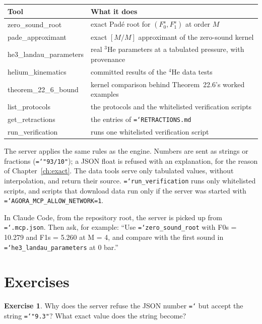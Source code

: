 \documentclass[11pt,a4paper,openany]{book}
\newcommand{\Fzs}{F_0^{s}}
\newcommand{\Fos}{F_1^{s}}
\newcommand{\code}[1]{\texttt{\hyphenchar\font=`\-\relax #1}}
\theoremstyle{definition}
\newtheorem{exercise}{Exercise}[chapter]
\theoremstyle{plain}
\begin{document}
\begin{center}
\small
\begin{tabular}{>{\ttfamily}l>{\raggedright\arraybackslash}p{9.6cm}}
\toprule
\textrm{Tool} & What it does \\
\midrule
zero\_sound\_root & exact Padé root for $(\Fzs,\Fos)$ at order $M$ \\
pade\_approximant & exact $[M/M]$ approximant of the zero-sound kernel \\
he3\_landau\_parameters & real $^3$He parameters at a tabulated pressure, with provenance \\
helium\_kinematics & committed results of the $^4$He data tests \\
theorem\_22\_6\_bound & kernel comparison behind Theorem~22.6's worked examples \\
list\_protocols & the protocols and the whitelisted verification scripts \\
get\_retractions & the entries of \code{RETRACTIONS.md} \\
run\_verification & runs one whitelisted verification script \\
\bottomrule
\end{tabular}
\end{center}

The server applies the same rules as the engine. Numbers are sent as strings or fractions
(\code{"93/10"}); a JSON float is refused with an explanation, for the reason of
Chapter~\ref{ch:exact}. The data tools serve only tabulated values, without interpolation, and
return their source. \code{run\_verification} runs only whitelisted scripts, and scripts that
download data run only if the server was started with \code{AGORA\_MCP\_ALLOW\_NETWORK=1}.

\begin{runit}
In Claude Code, from the repository root, the server is picked up from \code{.mcp.json}. Then
ask, for example: ``Use \code{zero\_sound\_root} with F0s = 10.279 and F1s = 5.260 at M = 4, and
compare with the first sound in \code{he3\_landau\_parameters} at 0 bar.''
\end{runit}

\section*{Exercises}
\begin{exercise}\label{ex:mcpfloat}
Why does the server refuse the JSON number \code{9.3} but accept the string \code{"9.3"}? What
exact value does the string become?
\end{exercise}
\end{document}
